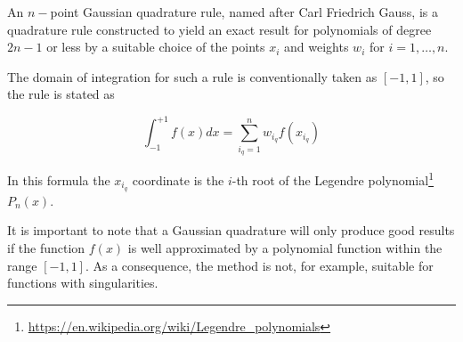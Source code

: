 An $n-$point Gaussian quadrature rule, named after Carl Friedrich Gauss, is a quadrature rule constructed
to yield an exact result for polynomials of degree $2n-1$ or less by a suitable choice of the points $x_i$
and weights $w_i$ for $i=1,\dots,n$.

The domain of integration for such a rule is conventionally taken as $[-1,1]$, so the rule is stated as
\begin{mdframed}[backgroundcolor=blue!5]
\[
\int_{-1}^{+1} f(x) dx = \sum_{i_q=1}^n w_{i_q} f(x_{i_q})
\]
\end{mdframed}
In this formula the $x_{i_q}$ coordinate is 
the $i$-th root of the {\color{olive} Legendre polynomial}\footnote{\url{https://en.wikipedia.org/wiki/Legendre_polynomials}} $P_n(x)$. 

It is important to note that a Gaussian quadrature will only produce good results if the function $f(x)$
is well approximated by a polynomial function within the range $[-1,1]$.
As a consequence, the method is not, for example, suitable for functions with singularities.


